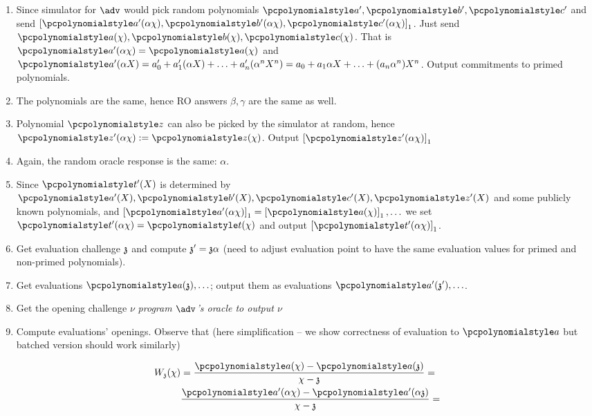 \documentclass[runningheads,11pt]{llncs}
\begin{document}
\begin{enumerate}
\begin{enumerate}
    \begin{enumerate}
    \item Since simulator for $\adv$ would pick random polynomials $\p{a'},
      \p{b'}, \p{c'}$ and send $\gone{\p{a'} (\alpha \chi), \p{b'} (\alpha
        \chi), \p{c'} (\alpha \chi)}$. Just send $\p{a} (\chi), \p{b} (\chi),
      \p{c} (\chi)$. That is $\p{a'} (\alpha \chi) = \p{a} (\chi)$ and 
      $\p{a'} (\alpha X) = a'_0 + a'_1( \alpha X) + \ldots + a'_n (\alpha^n
      X^n)= a_0 + a_1 \alpha X + \ldots + (a_n \alpha^n) X^n$. Output
      commitments to primed polynomials.
    \item The polynomials are the same, hence RO answers $\beta, \gamma$ are the
      same as well.
    \item Polynomial $\p{z}$ can also be picked by the simulator at random,
      hence $\p{z'} (\alpha \chi) := \p{z} (\chi)$. Output $\gone{\p{z'}
        (\alpha \chi)}$
    \item Again, the random oracle response is the same: $\alpha$.
    \item Since $\p{t'} (X)$ is determined by $\p{a'} (X), \p{b'} (X), \p{c'}
      (X), \p{z'} (X)$ and some publicly known polynomials, and $\gone{\p{a'}
        (\alpha \chi)} = \gone{\p{a} (\chi)}, \ldots$ we set $\p{t'} (\alpha
      \chi) = \p{t} (\chi)$ and output $\gone{\p{t'} (\alpha \chi)}$.
    \item Get evaluation challenge $\mathfrak{z}$ and compute $\mathfrak{z}' = \mathfrak{z} \alpha$
      (need to adjust evaluation point to have the same evaluation values for
      primed and non-primed polynomials). 
    \item Get evaluations $\p{a} (\chz), \ldots$; output them as evaluations
      $\p{a'} (\chz'), \ldots$.
    \item Get the opening challenge $\nu$ \emph{program $\adv$'s oracle to
        output $\nu$} 
  \item Compute evaluations' openings. Observe that (here simplification -- we
    show correctness of evaluation to $\p{a}$ but batched version should work similarly)
    \end{enumerate}
    \begin{align}
      W_{\chz} (\chi) & = \frac{\p{a} (\chi) - \p{a} (\chz)}{\chi - \chz} = \\
                      & \frac{\p{a'} (\alpha \chi) - \p{a'} (\alpha \chz)}{\chi - \chz} = \\

\end{align}
\end{enumerate}
\end{enumerate}
\end{document}
